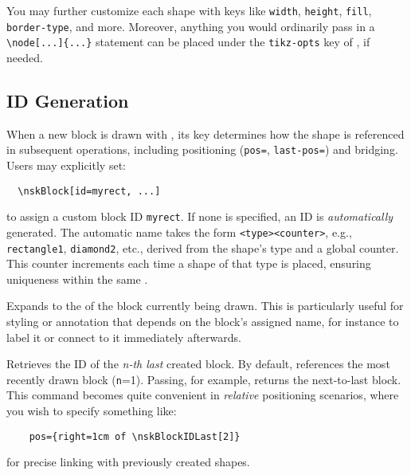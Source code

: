 \documentclass[show-experimental]{l3doc}
\begin{document}
You may further customize each shape with  keys like
\verb|width|, \verb|height|, \verb|fill|, \verb|border-type|, and more.
Moreover, anything you would ordinarily pass in a
\verb|\node[...]{...}| statement can be placed under the \texttt{tikz-opts}
key of , if needed.


\subsection{ID Generation}

When a new block is drawn with , its  key determines
how the shape is referenced in subsequent operations, including positioning
(\verb|pos=|, \verb|last-pos=|) and bridging. Users may explicitly set:

\begin{lstlisting}
  \nskBlock[id=myrect, ...]
\end{lstlisting}

to assign a custom block ID \texttt{myrect}. If none is specified, an ID is
\emph{automatically} generated. The automatic name takes the form
\texttt{<type><counter>}, e.g., \texttt{rectangle1}, \texttt{diamond2}, etc.,
derived from the shape’s type and a global counter. This counter
increments each time a shape of that type is placed, ensuring uniqueness
within the same .

\begin{function}{\nskBlockID}
	\begin{syntax}
	\end{syntax}
	Expands to the  of the block currently being drawn. This is
	particularly useful for styling or annotation that depends on the block’s
	assigned name, for instance to label it or connect to it immediately
	afterwards.
\end{function}

\begin{function}{\nskBlockIDLast}
	\begin{syntax}
		 \oarg{n}
	\end{syntax}
	Retrieves the ID of the \emph{n-th last} created block. By default,
	 references the most recently drawn block (\texttt{n}=1).
	Passing, for example,  returns the next-to-last
	block. This command becomes quite convenient in \emph{relative}
	positioning scenarios, where you wish to specify something like:

	\begin{lstlisting}
    pos={right=1cm of \nskBlockIDLast[2]}
  \end{lstlisting}

	for precise linking with previously created shapes.
\end{function}
\end{document}
